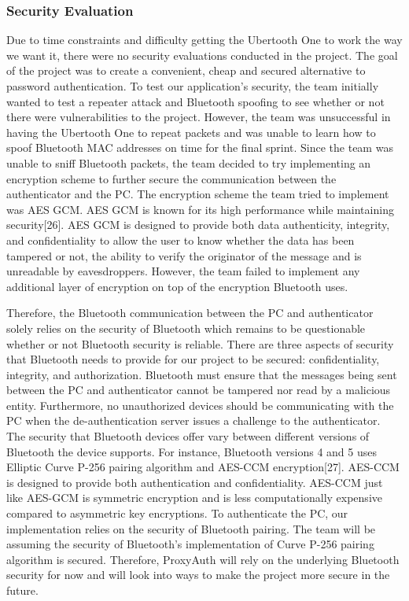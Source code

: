 \documentclass[letterpaper,twocolumn,10pt]{article}
\begin{document}
{{\subsubsection{Security Evaluation}
Due to time constraints and difficulty getting the Ubertooth One to work the way we want it, there were no security evaluations conducted in the project. The goal of the project was to create a convenient, cheap and secured alternative to password authentication. To test our application's security, the team initially wanted to test a repeater attack and Bluetooth spoofing to see whether or not there were vulnerabilities to the project. However, the team was unsuccessful in having the Ubertooth One to repeat packets and was unable to learn how to spoof Bluetooth MAC addresses on time for the final sprint. Since the team was unable to sniff Bluetooth packets, the team decided to try implementing an encryption scheme to further secure the communication between the authenticator and the PC. The encryption scheme the team tried to implement was AES GCM. AES GCM is known for its high performance while maintaining security[26]. AES GCM is designed to provide both data authenticity, integrity, and confidentiality to allow the user to know whether the data has been tampered or not, the ability to verify the originator of the message and is unreadable by eavesdroppers. However, the team failed to implement any additional layer of encryption on top of the encryption Bluetooth uses.

Therefore, the Bluetooth communication between the PC and authenticator solely relies on the security of Bluetooth which remains to be questionable whether or not Bluetooth security is reliable. There are three aspects of security that Bluetooth needs to provide for our project to be secured: confidentiality, integrity, and authorization. Bluetooth must ensure that the messages being sent between the PC and authenticator cannot be tampered nor read by a malicious entity. Furthermore, no unauthorized devices should be communicating with the PC when the de-authentication server issues a challenge to the authenticator. The security that Bluetooth devices offer vary between different versions of Bluetooth the device supports. For instance, Bluetooth versions 4 and 5 uses Elliptic Curve P-256 pairing algorithm and AES-CCM encryption[27]. AES-CCM is designed to provide both authentication and confidentiality. AES-CCM just like AES-GCM is symmetric encryption and is less computationally expensive compared to asymmetric key encryptions. To authenticate the PC, our implementation relies on the security of Bluetooth pairing. The team will be assuming the security of Bluetooth's implementation of Curve P-256 pairing algorithm is secured. Therefore, ProxyAuth will rely on the underlying Bluetooth security for now and will look into ways to make the project more secure in the future.

}}
\end{document}
